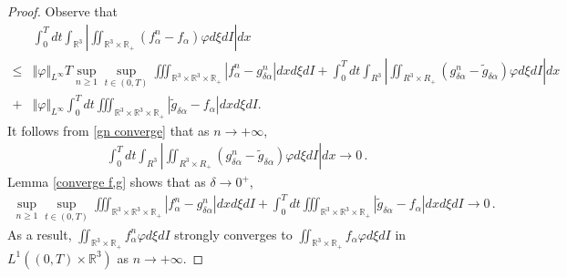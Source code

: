 \documentclass[reqno,11pt]{amsart}
\numberwithin{equation}{section}
\def\R{\mathbb{R}}
\begin{document}
\begin{proof}
	Observe that
	\begin{equation*}
		\begin{aligned}
			&\int_{0}^{T}dt \int_{\R^3} |\iint_{ \R^3 \times \R_+} (f^n_\alpha -f_\alpha )\varphi d\xi dI|dx \\
			\leq &\Vert \varphi \Vert_{L^\infty} T \sup_{n \geq 1} \sup_{t \in (0, T)} \iiint_{ \R^3\times \R^3 \times \R_+} |f^n_\alpha -g^n_{\delta \alpha } | dxd\xi dI +\int_{0}^{T}dt \int_{R^3} |\iint_{ R^3 \times R_+} (g^n_{\delta \alpha } -\tilde{g}_{\delta \alpha } )\varphi d\xi dI|dx \\
			+ &	\Vert \varphi \Vert_{L^\infty} \int_{0}^{T}dt \iiint_{ \R^3\times \R^3 \times \R_+} |\tilde{g}_{\delta \alpha } -f_\alpha |dx d\xi dI .
		\end{aligned}
	\end{equation*}
It follows from \eqref{gn converge} that as $ n \to + \infty$,
\begin{equation*}
  \begin{aligned}
    \int_{0}^{T}dt \int_{R^3} |\iint_{ R^3 \times R_+} (g^n_{\delta \alpha } -\tilde{g}_{\delta \alpha } )\varphi d\xi dI|dx \to 0 \,.
  \end{aligned}
\end{equation*}
Lemma \ref{converge f,g} shows that as $\delta \to 0^+$,
\begin{equation*}
  \begin{aligned}
    \sup_{n \geq 1} \sup_{t \in (0, T)} \iiint_{ \R^3\times \R^3 \times \R_+} |f^n_\alpha -g^n_{\delta \alpha } | dxd\xi dI + \int_{0}^{T}dt \iiint_{ \R^3\times \R^3 \times \R_+} |\tilde{g}_{\delta \alpha } -f_\alpha |dx d\xi dI \to 0 \,.
  \end{aligned}
\end{equation*}
As a result, $\iint_{ \R^3 \times \R_+} f^n_\alpha \varphi d\xi dI$ strongly converges to $ \iint_{ \R^3 \times \R_+} f_\alpha \varphi d\xi dI $ in $L^1 ( (0, T) \times \R^3 )$ as $n \to + \infty$.


\end{proof}
\end{document}
